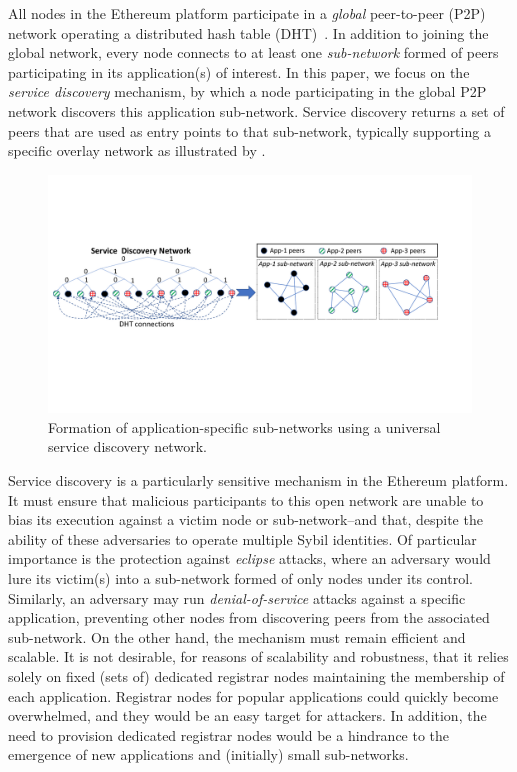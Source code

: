 All nodes in the Ethereum platform participate in a \emph{global} peer-to-peer (P2P) network operating a distributed hash table (DHT)~\cite{maymounkov2002kademlia}.
In addition to joining the global network, every node connects to at least one \emph{sub-network} formed of peers participating in its application(s) of interest.
In this paper, we focus on the \emph{service discovery} mechanism, by which a node participating in the global P2P network discovers this application sub-network.
Service discovery returns a set of peers that are used as entry points to that sub-network, typically supporting a specific overlay network as illustrated by .

\begin{figure}[b!]
    \includegraphics[width=1\linewidth]{img/subnetwork}
    \vspace{-0.15in}
    \caption{Formation of application-specific sub-networks using a universal service discovery network.
    \protect{}
    }
    \label{fig:subnetwork}
    \vspace{-0.15in}
\end{figure}

Service discovery is a particularly sensitive mechanism in the Ethereum platform.
It must ensure that malicious participants to this open network are unable to bias its execution against a victim node or sub-network--and that, despite the ability of these adversaries to operate multiple Sybil identities.
Of particular importance is the protection against \emph{eclipse} attacks, where an adversary would lure its victim(s) into a sub-network formed of only nodes under its control.
Similarly, an adversary may run \emph{denial-of-service} attacks against a specific application, preventing other nodes from discovering peers from the associated sub-network.
On the other hand, the mechanism must remain efficient and scalable.
It is not desirable, for reasons of scalability and robustness, that it relies solely on fixed (sets of) dedicated registrar nodes maintaining the membership of each application.
Registrar nodes for popular applications could quickly become overwhelmed, and they would be an easy target for attackers.
In addition, the need to provision dedicated registrar nodes would be a hindrance to the emergence of new applications and (initially) small sub-networks.

